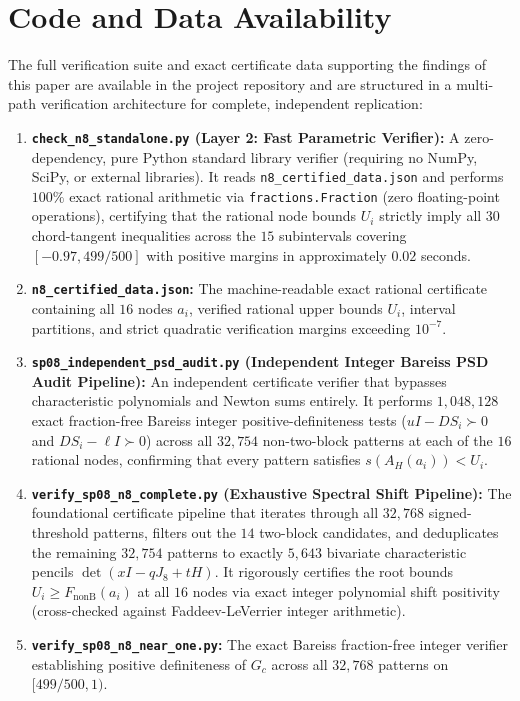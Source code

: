 \documentclass[11pt,reqno]{article}
\theoremstyle{definition}
\begin{document}
\section*{Code and Data Availability}
The full verification suite and exact certificate data supporting the findings of this paper are available in the project repository and are structured in a multi-path verification architecture for complete, independent replication:
\begin{enumerate}
    \item \textbf{\texttt{check\_n8\_standalone.py} (Layer 2: Fast Parametric Verifier):} A zero-dependency, pure Python standard library verifier (requiring no NumPy, SciPy, or external libraries). It reads \texttt{n8\_certified\_data.json} and performs $100\%$ exact rational arithmetic via \texttt{fractions.Fraction} (zero floating-point operations), certifying that the rational node bounds $U_i$ strictly imply all $30$ chord-tangent inequalities across the $15$ subintervals covering $[-0.97, 499/500]$ with positive margins in approximately $0.02$ seconds.
    \item \textbf{\texttt{n8\_certified\_data.json}:} The machine-readable exact rational certificate containing all $16$ nodes $a_i$, verified rational upper bounds $U_i$, interval partitions, and strict quadratic verification margins exceeding $10^{-7}$.
    \item \textbf{\texttt{sp08\_independent\_psd\_audit.py} (Independent Integer Bareiss PSD Audit Pipeline):} An independent certificate verifier that bypasses characteristic polynomials and Newton sums entirely. It performs $1{,}048{,}128$ exact fraction-free Bareiss integer positive-definiteness tests ($u I - D S_i \succ 0$ and $D S_i - \ell I \succ 0$) across all $32{,}754$ non-two-block patterns at each of the $16$ rational nodes, confirming that every pattern satisfies $s(A_H(a_i)) < U_i$.
    \item \textbf{\texttt{verify\_sp08\_n8\_complete.py} (Exhaustive Spectral Shift Pipeline):} The foundational certificate pipeline that iterates through all $32{,}768$ signed-threshold patterns, filters out the $14$ two-block candidates, and deduplicates the remaining $32{,}754$ patterns to exactly $5{,}643$ bivariate characteristic pencils $\det(xI - qJ_8 + tH)$. It rigorously certifies the root bounds $U_i \ge F_{\mathrm{nonB}}(a_i)$ at all $16$ nodes via exact integer polynomial shift positivity (cross-checked against Faddeev-LeVerrier integer arithmetic).
    \item \textbf{\texttt{verify\_sp08\_n8\_near\_one.py}:} The exact Bareiss fraction-free integer verifier establishing positive definiteness of $G_c$ across all $32{,}768$ patterns on $[499/500, 1)$.

\end{enumerate}
\end{document}
